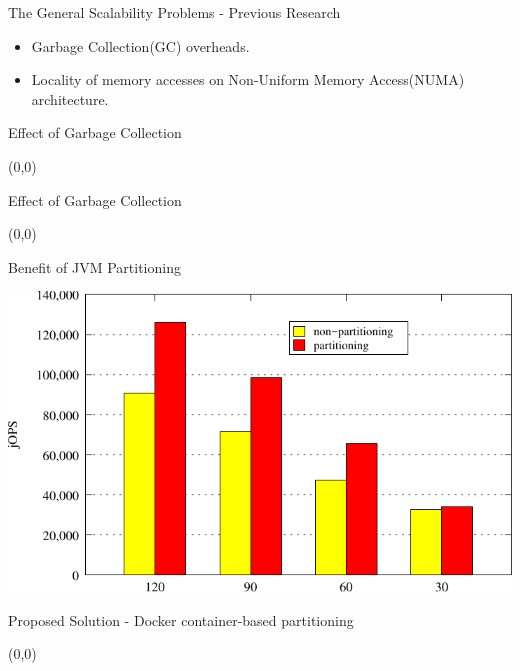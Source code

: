 \documentclass[english]{beamer} %
\begin{document}
\begin{frame}{The General Scalability Problems - Previous Research}
    \begin{itemize}[<+-| alert@+>]
    \item Garbage Collection(GC) overheads.
    \item Locality of memory accesses on Non-Uniform Memory Access(NUMA)
    architecture.
    \end{itemize}
\end{frame}

\begin{frame}{Effect of Garbage Collection }
\begin{textblock}{1}(0,0)
\end{textblock} 
\end{frame}

\begin{frame}{Effect of Garbage Collection}
\begin{textblock}{1}(0,0)
\end{textblock} 
\end{frame}

\begin{frame}{Benefit of JVM Partitioning}
\begin{center}
\includegraphics[scale=0.9]{graph/SPECjbb2013}
\end{center}
\end{frame}

\begin{frame}{Proposed Solution - Docker container-based partitioning}
\begin{textblock}{1}(0,0)
\end{textblock} 
\end{frame}
\end{document}
